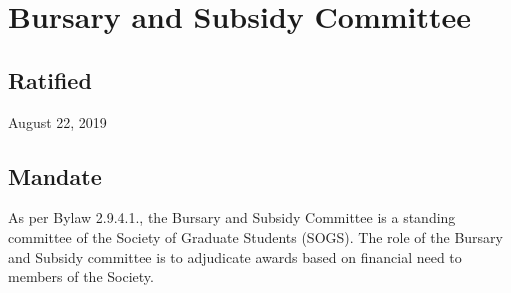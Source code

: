 \section{Bursary and Subsidy Committee}

\subsection{Ratified}
August 22, 2019

\subsection{Mandate}
As per Bylaw 2.9.4.1., the Bursary and Subsidy Committee is a standing committee of the Society of Graduate Students (SOGS). The role of the Bursary and Subsidy committee is to adjudicate awards based on financial need to members of the Society.


